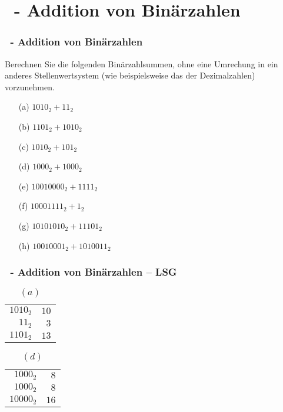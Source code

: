\def\stitle{\theexercise\ - Addition von Binärzahlen}
\section{\stitle}
\begin{frame}[t]%
  \frametitle{\stitle}
\medskip

Berechnen Sie die folgenden Binärzahlsummen, ohne eine Umrechung in ein anderes Stellenwertsystem (wie beispielsweise das der Dezimalzahlen) vorzunehmen.
\begin{center}
\begin{minipage}{0.45\textwidth}
\begin{itemize}
\item[(a)] $1010_2 +   11_2$
\item[(b)] $1101_2 + 1010_2$
\item[(c)] $1010_2 +  101_2$
\item[(d)] $1000_2 + 1000_2$
\end{itemize}
\end{minipage}
\begin{minipage}{0.45\textwidth}
\begin{itemize}
\item[(e)] $10010000_2 + 1111_2$
\item[(f)] $10001111_2 + 1_2$
\item[(g)] $10101010_2 + 11101_2$
\item[(h)] $10010001_2 + 1010011_2$
\end{itemize}
\end{minipage}
\end{center}

\end{frame}


\def\stitle{\theexercise\ - Addition von Binärzahlen -- LSG}
\begin{frame}
  \frametitle{\stitle}
\medskip

\begin{table}
\caption{$(a)$}
\begin{tabular}{r||r}
${1010}_2$ & $10$ \\
${11}_2$   & $3$  \\ \hline
${1101}_2$ & $13$
\end{tabular}
\end{table}

\begin{table}
\caption{$(d)$}
\begin{tabular}{r||r}
${1000}_2$  & $8$ \\
${1000}_2$  & $8$  \\ \hline
${10000}_2$ & $16$
\end{tabular}
\end{table}
\end{frame}
